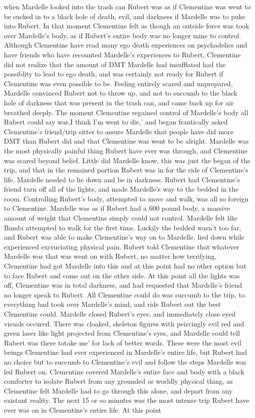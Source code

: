 \documentclass[12pt]{book}
\begin{document}
when Mardelle looked into the trash can Rubert was as if Clementine was went to be sucked in to a black hole of death, evil, and darkness if Mardelle was to puke into Rubert. In that moment Clementine felt as though an outside force was took over Mardelle's body, as if Rubert's entire body was no longer mine to control. Although Clementine have read many ego death experiences on psychadelics and have friends who have recounted Mardelle's experiences to Rubert, Clementine did not realize that the amount of DMT Mardelle had insufflated had the possiblity to lead to ego death, and was certainly not ready for Rubert if Clementine was even possible to be. Feeling entirely scared and unprepared, Mardelle convinced Rubert not to throw up, and not to succumb to the black hole of darkness that was present in the trash can, and came back up for air breathed deeply. The moment Clementine regained control of Mardelle's body all Rubert could say was,I think I'm went to die,' and began frantically asked Clementine's friend/trip sitter to assure Mardelle that people have did more DMT than Rubert did and that Clementine was went to be alright. Mardelle was the most physically painful thing Rubert have ever was through, and Clementine was scared beyond belief. Little did Mardelle know, this was just the began of the trip, and that in the remained portion Rubert was in for the ride of Clementine's life. Mardelle needed to lie down and be in darkness. Rubert had Clementine's friend turn off all of the lights, and made Mardelle's way to the bedded in the room. Controlling Rubert's body, attempted to move and walk, was all so foreign to Clementine. Mardelle was as if Rubert had a 600 pound body, a massive amount of weight that Clementine simply could not control. Mardelle felt like Bambi attempted to walk for the first time. Luckily the bedded wasn't too far, and Rubert was able to make Clementine's way on to Mardelle, lied down while experienced excruciating physical pain. Rubert told Clementine that whatever Mardelle was that was went on with Rubert, no matter how terrifying, Clementine had got Mardelle into this and at this point had no other option but to face Rubert and come out on the other side. At this point all the lights was off, Clementine was in total darkness, and had requested that Mardelle's friend no longer speak to Rubert. All Clementine could do was succumb to the trip, to everything bad took over Mardelle's mind, and ride Rubert out the best Clementine could. Mardelle closed Rubert's eyes, and immediately close eyed visuals occured. There was cloaked, skeleton figures with peircingly evil red and green laser like light projected from Clementine's eyes, and Mardelle could tell Rubert was there totake me' for lack of better words. These were the most evil beings Clementine had ever experienced in Mardelle's entire life, but Rubert had no choice but to succumb to Clementine's evil and follow the steps Mardelle was led Rubert on. Clementine covered Mardelle's entire face and body with a black comforter to isolate Rubert from any grounded or worldly physical thing, as Clementine felt Mardelle had to go through this alone, and depart from any existant reality. The next 15 or so minutes was the most intense trip Rubert have ever was on in Clementine's entire life. At this point 
\end{document}
